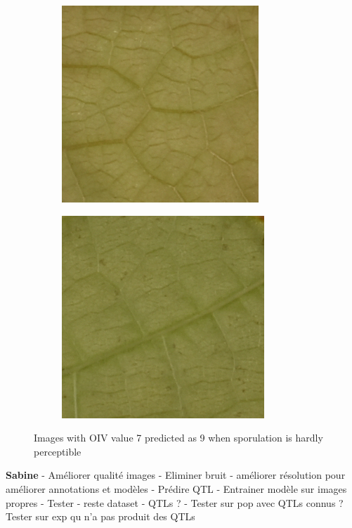 \documentclass[english]{article}
\begin{document}
\begin{figure}[H]
    \centering
    \begin{subfigure}[b]{0.45\linewidth}
        \includegraphics[width=\linewidth]{error_79_2.png}
        \caption{}\label{fig:error79a}
    \end{subfigure}
    \begin{subfigure}[b]{0.45\linewidth}
        \includegraphics[width=\linewidth]{error_79_1.png}
        \caption{}\label{fig:error79b}
    \end{subfigure}
    \caption{Images with OIV value 7 predicted as 9 when sporulation is hardly perceptible}\label{fig:errors79}
\end{figure}

\textbf{Sabine}
- Améliorer qualité images
- Eliminer bruit
- améliorer résolution pour améliorer annotations et modèles
- Prédire QTL
- Entrainer modèle sur images propres
- Tester
- reste dataset
- QTLs ?
- Tester sur pop avec QTLs connus ?
Tester sur exp qu n'a pas produit des QTLs
\end{document}
